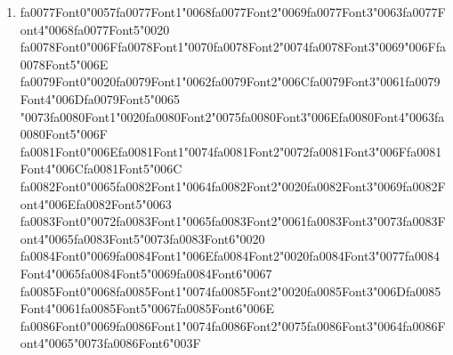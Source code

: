 \documentclass[12pt]{article}
\begin{document}
\begin{enumerate}[label=Q\arabic*.]
 \begin{enumerate}[label=(\Alph*)]
     \item Forcing sparse parameter updates
     \item Encouraging smaller weight magnitudes
     \item Reducing the number of layers in the network
     \item Eliminating bias terms
 \end{enumerate}
 
 \item {\csname fa0077Font0\endcsname\char"0057}{\csname fa0077Font1\endcsname\char"0068}{\csname fa0077Font2\endcsname\char"0069}{\csname fa0077Font3\endcsname\char"0063}{\csname fa0077Font4\endcsname\char"0068}{\csname fa0077Font5\endcsname\char"0020} {\csname fa0078Font0\endcsname\char"006F}{\csname fa0078Font1\endcsname\char"0070}{\csname fa0078Font2\endcsname\char"0074}{\csname fa0078Font3\endcsname\char"0069}{\char"006F}{\csname fa0078Font5\endcsname\char"006E} {\csname fa0079Font0\endcsname\char"0020}{\csname fa0079Font1\endcsname\char"0062}{\csname fa0079Font2\endcsname\char"006C}{\csname fa0079Font3\endcsname\char"0061}{\csname fa0079Font4\endcsname\char"006D}{\csname fa0079Font5\endcsname\char"0065} {\char"0073}{\csname fa0080Font1\endcsname\char"0020}{\csname fa0080Font2\endcsname\char"0075}{\csname fa0080Font3\endcsname\char"006E}{\csname fa0080Font4\endcsname\char"0063}{\csname fa0080Font5\endcsname\char"006F} {\csname fa0081Font0\endcsname\char"006E}{\csname fa0081Font1\endcsname\char"0074}{\csname fa0081Font2\endcsname\char"0072}{\csname fa0081Font3\endcsname\char"006F}{\csname fa0081Font4\endcsname\char"006C}{\csname fa0081Font5\endcsname\char"006C} {\csname fa0082Font0\endcsname\char"0065}{\csname fa0082Font1\endcsname\char"0064}{\csname fa0082Font2\endcsname\char"0020}{\csname fa0082Font3\endcsname\char"0069}{\csname fa0082Font4\endcsname\char"006E}{\csname fa0082Font5\endcsname\char"0063} {\csname fa0083Font0\endcsname\char"0072}{\csname fa0083Font1\endcsname\char"0065}{\csname fa0083Font2\endcsname\char"0061}{\csname fa0083Font3\endcsname\char"0073}{\csname fa0083Font4\endcsname\char"0065}{\csname fa0083Font5\endcsname\char"0073}{\csname fa0083Font6\endcsname\char"0020} {\csname fa0084Font0\endcsname\char"0069}{\csname fa0084Font1\endcsname\char"006E}{\csname fa0084Font2\endcsname\char"0020}{\csname fa0084Font3\endcsname\char"0077}{\csname fa0084Font4\endcsname\char"0065}{\csname fa0084Font5\endcsname\char"0069}{\csname fa0084Font6\endcsname\char"0067} {\csname fa0085Font0\endcsname\char"0068}{\csname fa0085Font1\endcsname\char"0074}{\csname fa0085Font2\endcsname\char"0020}{\csname fa0085Font3\endcsname\char"006D}{\csname fa0085Font4\endcsname\char"0061}{\csname fa0085Font5\endcsname\char"0067}{\csname fa0085Font6\endcsname\char"006E} {\csname fa0086Font0\endcsname\char"0069}{\csname fa0086Font1\endcsname\char"0074}{\csname fa0086Font2\endcsname\char"0075}{\csname fa0086Font3\endcsname\char"0064}{\csname fa0086Font4\endcsname\char"0065}{\char"0073}{\csname fa0086Font6\endcsname\char"003F}

\end{enumerate}
\end{document}
